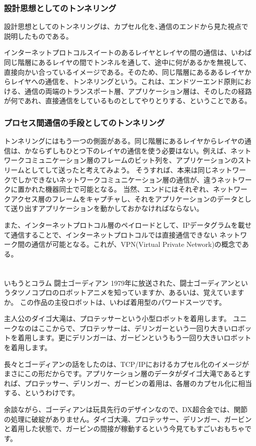 \subsubsection{設計思想としてのトンネリング}

設計思想としてのトンネリングは、カプセル化を､通信のエンドから見た視点で説明したものである。

インターネットプロトコルスイートのあるレイヤとレイヤの間の通信は、いわば同じ階層にあるレイヤの間でトンネルを通して、途中に何があるかを無視して、直接向かい合っているイメージである。そのため、同じ階層にあるあるレイヤからレイヤへの通信を、トンネリングという。これは、エンドツーエンド原則における、通信の両端のトランスポート層、アプリケーション層は、そのしたの経路が何であれ、直接通信をしているものとしてやりとりする、ということである。


\subsubsection{プロセス間通信の手段としてのトンネリング}

トンネリングにはもう一つの側面がある。同じ階層にあるレイヤからレイヤの通信は、かならずしもひとつ下のレイヤの通信を使う必要はない。例えば、ネットワークコミュニケーション層のフレームのビット列を、アプリケーションのストリームとしてして送ったと考えてみよう。
そうすれば、本来は同じネットワークでしかできないネットワークコミュニケーション層の通信が、違うネットワークに置かれた機器同士で可能となる。
当然、エンドにはそれぞれ、ネットワークアクセス層のフレームをキャプチャし、それをアプリケーションのデータとして送り出すアプリケーションを動かしておかなければならない。

また、インターネットプロトコル層のペイロードとして、IPデータグラムを載せて通信することで、インターネットプロトコルでは直接通信できない
ネットワーク間の通信が可能となる。これが、VPN(Virtual Private Network)の概念である。
\section*{}
\begin{itembox}[l]{いもうとコラム 闘士ゴーディアン}
1979年に放送された、闘士ゴーディアンというタツノコプロのロボットアニメを知っていますか、あるいは、覚えていますか。
この作品の主役ロボットは、いわば着用型のパワードスーツです。

主人公のダイゴ大滝は、プロテッサーという小型ロボットを着用します。
ユニークなのはここからで、プロテッサーは、デリンガーという一回り大きいロボットを着用します。更にデリンガーは、ガービンというもう一回り大きいロボットを着用します。

長々とゴーディアンの話をしたのは、TCP/IPにおけるカプセル化のイメージがまさにこの形だからです。アプリケーション層のデータがダイゴ大滝であるとすれば、プロテッサー、デリンガー、ガービンの着用は、各層のカプセル化に相当する、というわけです。

余談ながら、ゴーディアンは玩具先行のデザインなので、DX超合金では、関節の処理に破綻がありません。ダイゴ大滝、プロテッサー、デリンガー、ガービンと着用した状態で、ガービンの間接が稼動するという今見てもすごいおもちゃです。


\end{itembox}


